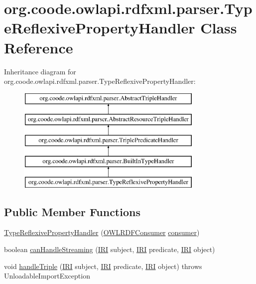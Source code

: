 \hypertarget{classorg_1_1coode_1_1owlapi_1_1rdfxml_1_1parser_1_1_type_reflexive_property_handler}{\section{org.\-coode.\-owlapi.\-rdfxml.\-parser.\-Type\-Reflexive\-Property\-Handler Class Reference}
\label{classorg_1_1coode_1_1owlapi_1_1rdfxml_1_1parser_1_1_type_reflexive_property_handler}
}
Inheritance diagram for org.\-coode.\-owlapi.\-rdfxml.\-parser.\-Type\-Reflexive\-Property\-Handler\-:\begin{figure}[H]
\begin{center}
\leavevmode
\includegraphics[height=5.000000cm]{classorg_1_1coode_1_1owlapi_1_1rdfxml_1_1parser_1_1_type_reflexive_property_handler}
\end{center}
\end{figure}
\subsection*{Public Member Functions}
\begin{DoxyCompactItemize}
\item 
\hyperlink{classorg_1_1coode_1_1owlapi_1_1rdfxml_1_1parser_1_1_type_reflexive_property_handler_a24e4670807d449f84d3add4acc067e44}{Type\-Reflexive\-Property\-Handler} (\hyperlink{classorg_1_1coode_1_1owlapi_1_1rdfxml_1_1parser_1_1_o_w_l_r_d_f_consumer}{O\-W\-L\-R\-D\-F\-Consumer} \hyperlink{classorg_1_1coode_1_1owlapi_1_1rdfxml_1_1parser_1_1_abstract_triple_handler_a4ccf4d898ff01eb1cadfa04b23d54e9c}{consumer})
\item 
boolean \hyperlink{classorg_1_1coode_1_1owlapi_1_1rdfxml_1_1parser_1_1_type_reflexive_property_handler_a97d1b367818dd20827b50ee42d493f85}{can\-Handle\-Streaming} (\hyperlink{classorg_1_1semanticweb_1_1owlapi_1_1model_1_1_i_r_i}{I\-R\-I} subject, \hyperlink{classorg_1_1semanticweb_1_1owlapi_1_1model_1_1_i_r_i}{I\-R\-I} predicate, \hyperlink{classorg_1_1semanticweb_1_1owlapi_1_1model_1_1_i_r_i}{I\-R\-I} object)
\item 
void \hyperlink{classorg_1_1coode_1_1owlapi_1_1rdfxml_1_1parser_1_1_type_reflexive_property_handler_a304a2513de33590ade21198e917ab958}{handle\-Triple} (\hyperlink{classorg_1_1semanticweb_1_1owlapi_1_1model_1_1_i_r_i}{I\-R\-I} subject, \hyperlink{classorg_1_1semanticweb_1_1owlapi_1_1model_1_1_i_r_i}{I\-R\-I} predicate, \hyperlink{classorg_1_1semanticweb_1_1owlapi_1_1model_1_1_i_r_i}{I\-R\-I} object)  throws Unloadable\-Import\-Exception 
\end{DoxyCompactItemize}
